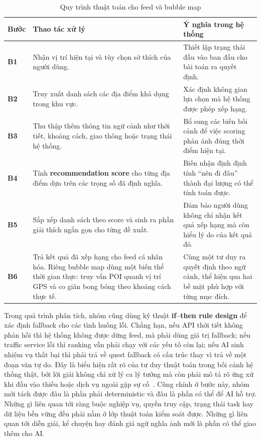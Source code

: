 \begin{table}[H]
\centering
\caption{Quy trình thuật toán cho feed và bubble map}
\label{tab:feed_algorithm}
\begin{tabularx}{\textwidth}{>{\raggedright\arraybackslash}p{1.6cm} X X}
\toprule
\textbf{Bước} & \textbf{Thao tác xử lý} & \textbf{Ý nghĩa trong hệ thống} \\
\midrule
\textbf{B1} & Nhận vị trí hiện tại và tùy chọn sở thích của người dùng. & Thiết lập trạng thái đầu vào ban đầu cho bài toán ra quyết định. \\
\textbf{B2} & Truy xuất danh sách các địa điểm khả dụng trong khu vực. & Xác định không gian lựa chọn mà hệ thống được phép xếp hạng. \\
\textbf{B3} & Thu thập thêm thông tin ngữ cảnh như thời tiết, khoảng cách, giao thông hoặc trạng thái hệ thống. & Bổ sung các biến bối cảnh để việc scoring phản ánh đúng thời điểm hiện tại. \\
\textbf{B4} & Tính \textbf{recommendation score} cho từng địa điểm dựa trên các trọng số đã định nghĩa. & Biến nhận định định tính ``nên đi đâu'' thành đại lượng có thể tính toán được. \\
\textbf{B5} & Sắp xếp danh sách theo score và sinh ra phần giải thích ngắn gọn cho từng đề xuất. & Đảm bảo người dùng không chỉ nhận kết quả xếp hạng mà còn hiểu lý do của kết quả đó. \\
\textbf{B6} & Trả kết quả đã xếp hạng cho feed cá nhân hóa. Riêng bubble map dùng một biến thể thời gian thực: truy vấn POI quanh vị trí GPS và co giãn bong bóng theo khoảng cách thực tế. & Cùng một tư duy ra quyết định theo ngữ cảnh, thể hiện qua hai bề mặt phù hợp với từng mục đích. \\
\bottomrule
\end{tabularx}
\end{table}

Trong quá trình phân tích, nhóm cũng dùng kỹ thuật \textbf{if--then rule
design} để xác định fallback cho các tình huống lỗi. Chẳng hạn, nếu API
thời tiết không phản hồi thì hệ thống không được dừng feed, mà phải dùng
giá trị fallback; nếu traffic service lỗi thì ranking vẫn phải chạy với
các yếu tố còn lại; nếu AI sinh nhiệm vụ thất bại thì phải trả về quest
fallback có cấu trúc thay vì trả về một đoạn văn tự do. Đây là biểu
hiện rất rõ của tư duy thuật toán trong bối cảnh hệ thống thật, bởi lời
giải không chỉ xử lý ca lý tưởng mà còn phải mô tả rõ ứng xử khi đầu
vào thiếu hoặc dịch vụ ngoài gặp sự cố~\cite{bevietnam_spec}. Cũng chính
ở bước này, nhóm mới tách được đâu là phần phải deterministic và đâu là
phần có thể để AI hỗ trợ. Những gì liên quan tới ràng buộc nghiệp vụ,
quyền truy cập, trạng thái task hay dữ liệu bền vững đều phải nằm ở lớp
thuật toán kiểm soát được. Những gì liên quan tới diễn giải, kể chuyện
hay đánh giá ngữ nghĩa ảnh mới là phần có thể giao thêm cho AI.

